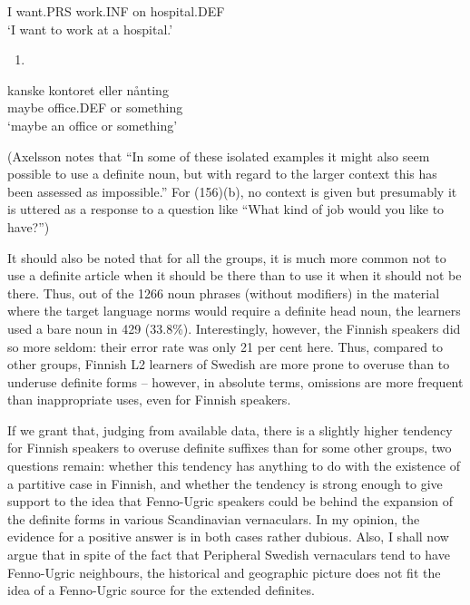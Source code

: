 I  want.PRS  work.INF  on  hospital.DEF\\ %


‘I want to work at a hospital.’
\z


\begin{enumerate} %
\item 
\end{enumerate} %
\ea\label{}
\gll kanske  kontoret  eller  nånting\\


maybe  office.DEF  or  something\\ %


‘maybe an office or something’ 
\z


(Axelsson notes that “In some of these isolated examples it might also seem possible to use a definite noun, but with regard to the larger context this has been assessed as impossible.” For (156)(b), no context is given but presumably it is uttered as a response to a question like “What kind of job would you like to have?”)

It should also be noted that for all the groups, it is much more common not to use a definite article when it should be there than to use it when it should not be there. Thus, out of the 1266 noun phrases (without modifiers) in the material where the target language norms would require a definite head noun, the learners used a bare noun in 429 (33.8\%). Interestingly, however, the Finnish speakers did so more seldom: their error rate was only 21 per cent here. Thus, compared to other groups, Finnish L2 learners of Swedish are more prone to overuse than to underuse definite forms – however, in absolute terms, omissions are more frequent than inappropriate uses, even for Finnish speakers.  

If we grant that, judging from available data, there is a slightly higher tendency for Finnish speakers to overuse definite suffixes than for some other groups, two questions remain: whether this tendency has anything to do with the existence of a partitive case in Finnish, and whether the tendency is strong enough to give support to the idea that Fenno-Ugric speakers could be behind the expansion of the definite forms in various Scandinavian vernaculars. In my opinion, the evidence for a positive answer is in both cases rather dubious. Also, I shall now argue that in spite of the fact that Peripheral Swedish vernaculars tend to have Fenno-Ugric neighbours, the historical and geographic picture does not fit the idea of a Fenno-Ugric source for the extended definites.

